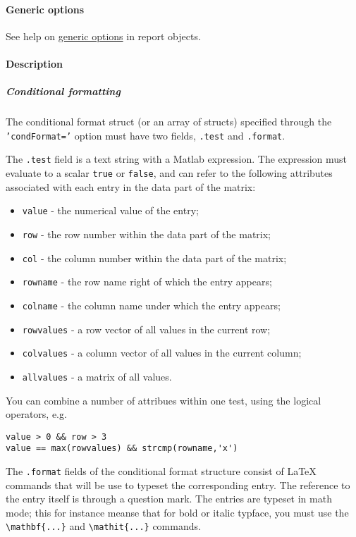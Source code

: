 \paragraph{Generic options}

See help on \href{report/Contents}{generic options} in report objects.

\paragraph{Description}

\subparagraph{Conditional formatting}

The conditional format struct (or an array of structs) specified through
the \texttt{'condFormat='} option must have two fields, \texttt{.test}
and \texttt{.format}.

The \texttt{.test} field is a text string with a Matlab expression. The
expression must evaluate to a scalar \texttt{true} or \texttt{false},
and can refer to the following attributes associated with each entry in
the data part of the matrix:

\begin{itemize}
\itemsep1pt\parskip0pt
\item
  \texttt{value} - the numerical value of the entry;
\item
  \texttt{row} - the row number within the data part of the matrix;
\item
  \texttt{col} - the column number within the data part of the matrix;
\item
  \texttt{rowname} - the row name right of which the entry appears;
\item
  \texttt{colname} - the column name under which the entry appears;
\item
  \texttt{rowvalues} - a row vector of all values in the current row;
\item
  \texttt{colvalues} - a column vector of all values in the current
  column;
\item
  \texttt{allvalues} - a matrix of all values.
\end{itemize}

You can combine a number of attribues within one test, using the logical
operators, e.g.

\begin{verbatim}
value > 0 && row > 3
value == max(rowvalues) && strcmp(rowname,'x')
\end{verbatim}

The \texttt{.format} fields of the conditional format structure consist
of LaTeX commands that will be use to typeset the corresponding entry.
The reference to the entry itself is through a question mark. The
entries are typeset in math mode; this for instance meanse that for bold
or italic typface, you must use the
\texttt{\textbackslash{}mathbf\{...\}} and
\texttt{\textbackslash{}mathit\{...\}} commands.

